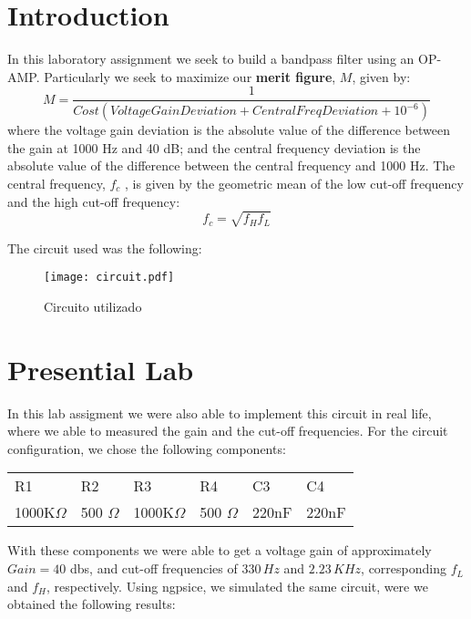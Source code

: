 \section{Introduction}
\label{sec:introduction}

In this laboratory assignment we seek to build a bandpass filter using an OP-AMP. Particularly we seek to maximize our \textbf{merit figure}, $M$, given by:
\begin{equation*}
    M = \frac{1}{Cost(VoltageGainDeviation+CentralFreqDeviation+10^{-6})}
\end{equation*}
where the voltage gain deviation is the absolute value of the difference between the gain at 1000 Hz and 40 dB; and the central frequency deviation is the absolute value of the difference between the central frequency and 1000 Hz. The central frequency, $f_c$ , is given by the geometric mean of the low cut-off frequency and the high cut-off frequency:
\begin{equation*}
    f_c = \sqrt{f_H f_L} 
\end{equation*}

The circuit used was the following:


\begin{figure}[H] \centering
\texttt{[image: circuit.pdf]}
\caption{Circuito utilizado}
\label{fig:circuit}
\end{figure}

\section{Presential Lab}

In this lab assigment we were also able to implement this circuit in real life, where we able to measured the gain and the cut-off frequencies.
For the circuit configuration, we chose the following components: 

\begin{table}[H]
\begin{tabular}{|l|l|l|l|l|l|}
R1 & R2 & R3 & R4  & C3 & C4                         \\ 
1000K$\Omega$ & 500 $\Omega$ & 1000K$\Omega$ & 500 $\Omega$ & 220nF & 220nF \\ 
\end{tabular}
\end{table}

With these components we were able to get a voltage gain of approximately $Gain = 40$ dbs, and cut-off frequencies of $330\, Hz$ and $2.23\,KHz$, corresponding $f_L$ and $f_H$, respectively. 
Using ngpsice, we simulated the same circuit, were we obtained the following results:

